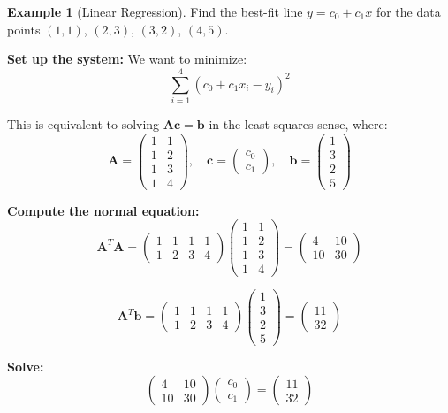 \documentclass[12pt]{article}
\numberwithin{equation}{section}
\newcommand{\vect}[1]{\boldsymbol{#1}}   %
\newcommand{\mat}[1]{\mathbf{#1}}        %
\theoremstyle{plain}
\theoremstyle{definition}
\newtheorem{example}[theorem]{Example}
\theoremstyle{remark}
\begin{document}
\begin{example}[Linear Regression]
Find the best-fit line $y = c_0 + c_1x$ for the data points $(1, 1)$, $(2, 3)$, $(3, 2)$, $(4, 5)$.

\textbf{Set up the system:} We want to minimize:
$$\sum_{i=1}^4 (c_0 + c_1x_i - y_i)^2$$

This is equivalent to solving $\mat{A}\vect{c} = \vect{b}$ in the least squares sense, where:
$$\mat{A} = \begin{pmatrix} 1 & 1 \\ 1 & 2 \\ 1 & 3 \\ 1 & 4 \end{pmatrix}, \quad \vect{c} = \begin{pmatrix} c_0 \\ c_1 \end{pmatrix}, \quad \vect{b} = \begin{pmatrix} 1 \\ 3 \\ 2 \\ 5 \end{pmatrix}$$

\textbf{Compute the normal equation:}
$$\mat{A}^T\mat{A} = \begin{pmatrix} 1 & 1 & 1 & 1 \\ 1 & 2 & 3 & 4 \end{pmatrix}\begin{pmatrix} 1 & 1 \\ 1 & 2 \\ 1 & 3 \\ 1 & 4 \end{pmatrix} = \begin{pmatrix} 4 & 10 \\ 10 & 30 \end{pmatrix}$$

$$\mat{A}^T\vect{b} = \begin{pmatrix} 1 & 1 & 1 & 1 \\ 1 & 2 & 3 & 4 \end{pmatrix}\begin{pmatrix} 1 \\ 3 \\ 2 \\ 5 \end{pmatrix} = \begin{pmatrix} 11 \\ 32 \end{pmatrix}$$

\textbf{Solve:}
$$\begin{pmatrix} 4 & 10 \\ 10 & 30 \end{pmatrix}\begin{pmatrix} c_0 \\ c_1 \end{pmatrix} = \begin{pmatrix} 11 \\ 32 \end{pmatrix}$$


\end{example}
\end{document}

